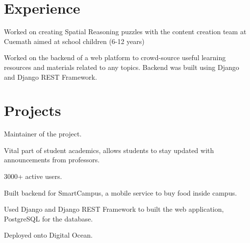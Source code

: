 \documentclass[]{abhijeet_viswa-deedy-resume-openfont}
\begin{document}
\hfill
\begin{minipage}[t]{0.70\textwidth}

\section{Experience}
\subsectionsep %
\begin{tightemize}
\item Worked on creating Spatial Reasoning puzzles with the content creation team at Cuemath aimed at school children (6-12 years)
\item Worked on the backend of a web platform to crowd-source useful learning resources and materials related to any topics.
Backend was built using Django and Django REST Framework.
\end{tightemize}
\primarysectionsep  %

\section{Projects}
\begin{tightemize}
\item Maintainer of the project.
\item Vital part of student academics, allows students to stay updated with announcements from professors.
\item 3000+ active users.
\end{tightemize}
\subsectionsep

\begin{tightemize}
 \item Built backend for SmartCampus, a mobile service to buy food inside campus.
 \item Used Django and Django REST Framework to built the web application, PostgreSQL for the database.
 \item Deployed onto Digital Ocean.
\end{tightemize}
\primarysectionsep  %


\end{minipage}
\end{document}
